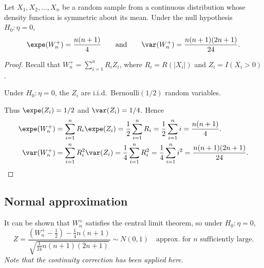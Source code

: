 \begin{theorem}
Let $X_1,X_2,\ldots,X_n$ be a random sample from a continuous distribution whose density function is symmetric about its mean. Under the null hypothesis $H_0:\eta=0$, 
\[
\expe(W^{+}_n) = \frac{n(n+1)}{4} \qquad\text{and}\qquad \var(W^{+}_n)	= \frac{n(n+1)(2n+1)}{24}.
\]
\end{theorem}

\begin{proof}
Recall that $W^{+}_n = \sum_{i=1}^n R_iZ_i$, where $R_i=R(|X_i|)$ and $Z_i = I(X_i > 0)$.

Under $H_0:\eta=0$, the $Z_i$ are i.i.d.\ $\text{Bernoulli}(1/2)$ random variables. 

Thus $\expe(Z_i)=1/2$ and $\var(Z_i)=1/4$. Hence
\begin{align*}
\expe(W^{+}_n) 
	& = \sum_{i=1}^n R_i\expe(Z_i) 
	= \frac{1}{2}\sum_{i=1}^n R_i
	= \frac{1}{2}\sum_{i=1}^n i
	= \frac{n(n+1)}{4}. \\
\var(W^{+}_n)
	& = \sum_{i=1}^n R_i^2 \var(Z_i) 
	= \frac{1}{4}\sum_{i=1}^n R_i^2
	= \frac{1}{4}\sum_{i=1}^n i^2
	= \frac{n(n+1)(2n+1)}{24}.
\end{align*}
\end{proof}


\subsection{Normal approximation}
It can be shown that $W^{+}_n$ satisfies the central limit theorem, so under $H_0:\eta=0$,
\[
Z = \frac{(W^{+}_n-\frac{1}{2}) -  \frac{1}{4}n(n+1)}{\sqrt{\frac{1}{24}n(n+1)(2n+1)}}
\sim N(0,1) \quad\text{approx. for $n$ sufficiently large.}
\]
\bit
\it Note that the continuity correction has been applied here.
\eit

